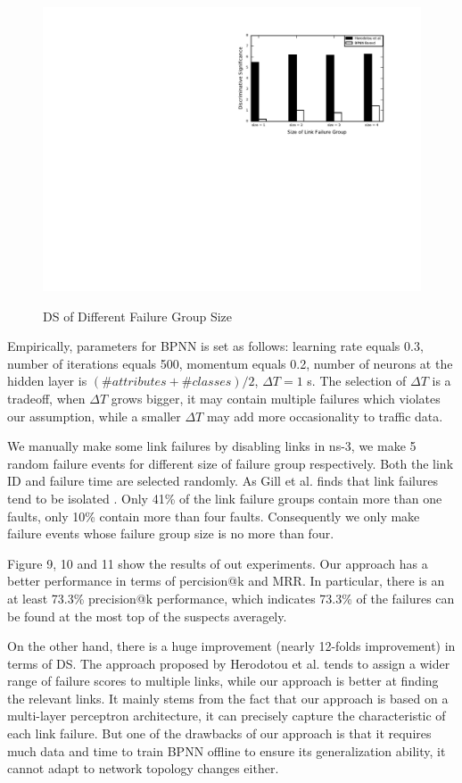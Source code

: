 \documentclass{sig-alternate-05-2015}
\begin{document}
\begin{figure}[t]
  \centering
  \includegraphics[scale=0.7]{ds} \\
  \caption{DS of Different Failure Group Size}
\end{figure}
Empirically, parameters for BPNN is set as follows: learning rate equals 0.3, number of iterations equals 500, momentum equals 0.2, number of neurons at the hidden layer is $(\# attributes + \# classes) / 2$, $\Delta T = 1 $ s. The selection of $\Delta T$ is a tradeoff, when $\Delta T$ grows bigger, it may contain multiple failures which violates our assumption, while a smaller $\Delta T$ may add more occasionality to traffic data.

We manually make some link failures by disabling links in ns-3, we make 5 random failure events for different size of failure group respectively. Both the link ID and failure time are selected randomly. As Gill et al. finds that link failures tend to be isolated \cite{gill2011understanding}. Only 41\% of the link failure groups contain more than one faults, only 10\% contain more than four faults. Consequently we only make failure events whose failure group size is no more than four.

Figure 9, 10 and 11 show the results of out experiments. Our approach has a better performance in terms of percision@k and MRR. In particular, there is an at least 73.3\% precision@k performance, which indicates 73.3\% of the failures can be found at the most top of the suspects averagely.

On the other hand, there is a huge improvement (nearly 12-folds improvement) in terms of DS. The approach proposed by Herodotou et al. tends to assign a wider range of failure scores to multiple links, while our approach is better at finding the relevant links. It mainly stems from the fact that our approach is based on a multi-layer perceptron architecture, it can precisely capture the characteristic of each link failure. But one of the drawbacks of our approach is that it requires much data and time to train BPNN offline to ensure its generalization ability, it cannot adapt to network topology changes either.
\end{document}
